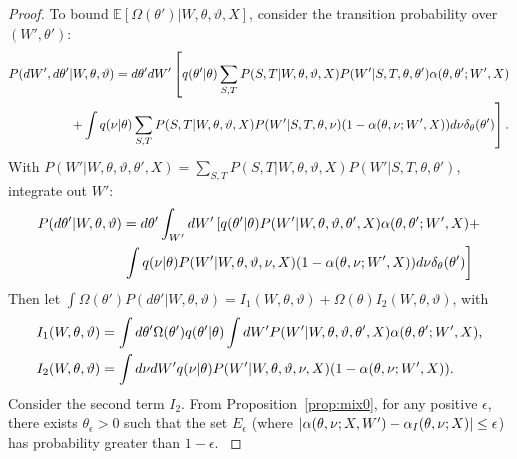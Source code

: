 \begin{proof}
To bound $\mathbb{E}\left[\Omega(\theta')  | W, \theta, \vartheta, X\right]$,
consider the transition probability over $(W',\theta')$:
\begin{align*}
  P(dW', d\theta'&| W, \theta, \vartheta)
=d\theta' dW' \left[q(\theta' | \theta)
  \sum_{S,T} P(S, T | W, \theta, \vartheta, X)P(W' | S, T, \theta, \theta')
\alpha(\theta, \theta' ; W', X)\right. \\
&\left.+ \int q(\nu | \theta) \sum_{S,T} P(S, T|W,\theta,\vartheta,
    X)P(W' | S, T, \theta, \nu) ( 1 - {\alpha(\theta, \nu ; W', X)})d\nu
    \delta_\theta(\theta')\right].
\end{align*}
With $P(W' | W, \theta, \vartheta, \theta', X) =
\sum_{S,T} P(S, T | W, \theta, \vartheta, X)P(W' | S, T, \theta, \theta')$,
integrate out $W'$:
\begin{align*}
  P(d\theta'| W, \theta, \vartheta) &=d\theta' \int_{W'}dW'
  \left[q(\theta' | \theta)
     P(W' | W, \theta, \vartheta, \theta', X) \alpha(\theta, \theta' ; W', X) + \right.\\
  &\left.  \int q(\ptheta | \theta)  P(W' |  W, \theta, \vartheta, \ptheta,
X) ( 1 - \alpha(\theta, \ptheta ; W', X))d\ptheta
\delta_\theta(\theta')\right] %
\end{align*}
Then let  $\int \Omega(\theta') P(d\theta'| W, \theta, \vartheta)
  = I_1(W, \theta, \vartheta) + \Omega(\theta) I_2(W, \theta, \vartheta) 
$, with
\begin{align*}
  &I_1(W, \theta, \vartheta) = \int d\theta' \Omega(\theta') q(\theta' | \theta)\int dW'P(W' | W, \theta, \vartheta, \theta', X)\alpha(\theta, \theta' ; W', X), \\
&I_2(W, \theta, \vartheta) =\int d\nu  dW'q(\nu | \theta)P(W' | W, \theta, \vartheta, \nu, X)(1 - \alpha(\theta, \nu ; W', X)).
\end{align*}
{Consider the second term $I_2$.
  From Proposition~\ref{prop:mix0}, for any positive $\epsilon$, there
  exists $\theta_\epsilon > 0$ such that the set $E_{\epsilon}$
  (where $|\alpha(\theta, \nu ; X,W') - \alpha_I(\theta, \nu ; X)| \le
  \epsilon$) has probability greater than $1-\epsilon$.
}
\end{proof}
